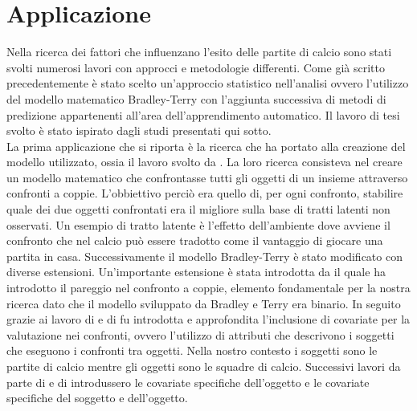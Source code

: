 \section{Applicazione}
Nella ricerca dei fattori che influenzano l'esito delle partite di calcio sono stati svolti numerosi lavori con approcci e metodologie differenti. Come già scritto precedentemente è stato scelto un'approccio statistico nell'analisi ovvero l'utilizzo del modello matematico Bradley-Terry \autocite{bradley1952rank} con l'aggiunta successiva di metodi di predizione appartenenti all'area dell'apprendimento automatico. %
Il lavoro di tesi svolto è stato ispirato dagli studi presentati qui sotto.\\
La prima applicazione che si riporta è la ricerca che ha portato alla creazione del modello utilizzato, ossia il lavoro svolto da \textcite{bradley1952rank}. La loro ricerca consisteva nel creare un modello matematico che confrontasse tutti gli oggetti di un insieme attraverso confronti a coppie. L'obbiettivo perciò era quello di, per ogni confronto, stabilire quale dei due oggetti confrontati era il migliore sulla base di tratti latenti non osservati. Un esempio di tratto latente è l'effetto dell'ambiente dove avviene il confronto che nel calcio può essere tradotto come il vantaggio di giocare una partita in casa. Successivamente il modello Bradley-Terry è stato modificato con diverse estensioni. Un'importante estensione è stata introdotta da \textcite{davidson1970extending} il quale ha introdotto il pareggio nel confronto a coppie, elemento fondamentale per la nostra ricerca dato che il modello sviluppato da Bradley e Terry era binario. In seguito grazie ai lavoro di \textcite{francis2010} e di \textcite{Turner2012Firth} fu introdotta e approfondita l'inclusione di covariate per la valutazione nei confronti, ovvero l'utilizzo di attributi che descrivono i soggetti che eseguono i confronti tra oggetti. Nella nostro contesto i soggetti sono le partite di calcio mentre gli oggetti sono le squadre di calcio. Successivi lavori da parte di \textcite{thurner2000policy} e di \textcite{mauerer2015modeling} introdussero le covariate specifiche dell'oggetto e le covariate specifiche del soggetto e dell'oggetto.\\ %
